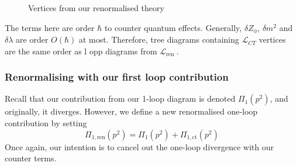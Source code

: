 \documentclass[11pt, oneside]{article}   	%
\theoremstyle{slanted}
\begin{document}
\begin{figure}[htpb]
\centering

\caption{Vertices from our renormalised theory}%
\label{fig:vertices}
\end{figure}

The terms here are order $ \hbar $ to 
counter quantum effects. Generally, 
$ \delta Z _ \phi $, $ \delta m ^ 2 $ and $ \delta \lambda $ 
are order $ O \left( \hbar  \right)  $ at most. 
Therefore, tree diagrams containing $ \mathcal{ L } _{CT } $ 
vertices are the same order as l opp diagrams 
from $ \mathcal{ L } _{ \text{ren }}$. 

\subsubsection{Renormalising with our first loop contribution}
Recall that our contribution from 
our 1-loop diagram is denoted 
$ \Pi _ 1 \left( p ^ 2  \right)  $, and originally, it diverges.
However, we define a new renormalised 
one-loop contribution by setting 
\[
\Pi_{1, \text{ren}} \left( p ^ 2  \right) = \Pi_{ 1}\left( p ^ 2  \right) 
+ \Pi _{ 1, \text{ct}} \left( p ^  2  \right) 
\] 
Once again, our intention is to 
cancel out the one-loop divergence 
with our counter terms. 
\end{document}
